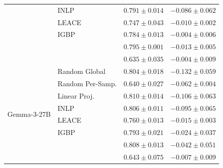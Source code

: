 \begin{longtable}{ll rr}
   & INLP & $0.791{\pm}0.014$ & $-0.086{\pm}0.062$ \\
   & LEACE & $0.747{\pm}0.043$ & $-0.010{\pm}0.002$ \\
   & IGBP & $0.784{\pm}0.013$ & $-0.004{\pm}0.006$ \\
   & \AmbGCE{} & $0.795{\pm}0.001$ & $-0.013{\pm}0.005$ \\
   & \TanGCE{} & \textbf{$0.635{\pm}0.035$} & $-0.004{\pm}0.009$ \\
  \midrule
  \multirow{8}{*}{Gemma-3-27B} & Random Global & $0.804{\pm}0.018$ & $-0.132{\pm}0.059$ \\
   & Random Per-Samp. & $0.640{\pm}0.027$ & $-0.062{\pm}0.004$ \\
   & Linear Proj. & $0.810{\pm}0.014$ & $-0.106{\pm}0.063$ \\
   & INLP & $0.806{\pm}0.011$ & $-0.095{\pm}0.065$ \\
   & LEACE & $0.760{\pm}0.013$ & $-0.015{\pm}0.003$ \\
   & IGBP & $0.793{\pm}0.021$ & $-0.024{\pm}0.037$ \\
   & \AmbGCE{} & $0.808{\pm}0.013$ & $-0.042{\pm}0.051$ \\
   & \TanGCE{} & \textbf{$0.643{\pm}0.075$} & $-0.007{\pm}0.009$ \\
\end{longtable}
